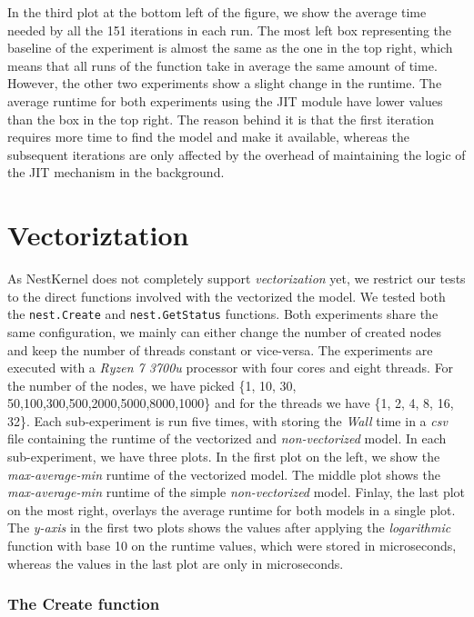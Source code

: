 In the third plot at the bottom left of the figure, we show the average time needed by all the 151 iterations in each run. The most left box representing the baseline of the experiment is almost the same as the one in the top right, which means that all runs of the function take in average the same amount of time. However, the other two experiments show a slight change in the runtime. The average runtime for both experiments using the JIT module have lower values than the box in the top right. The reason behind it is that the first iteration requires more time to find the model and make it available, whereas the subsequent iterations are only affected by the overhead of maintaining the logic of the JIT mechanism in the background.



\section{Vectoriztation}

As NestKernel does not completely support \emph	{vectorization} yet, we restrict our tests to the direct functions involved with the vectorized the model. We tested both the \texttt{nest.Create} and \texttt{nest.GetStatus} functions. Both experiments share the same configuration, we mainly can either change the number of created nodes and keep the number of threads constant or vice-versa. The experiments are executed with a \emph{Ryzen 7 3700u} processor with four cores and eight threads.
For the number of the nodes, we have picked \{1, 10, 30, 50,100,300,500,2000,5000,8000,1000\} and for the threads we have \{1, 2, 4, 8, 16, 32\}. Each sub-experiment is run five times, with storing the \emph{Wall} time in a \emph{csv} file containing the runtime of the vectorized and \emph{non-vectorized} model. In each sub-experiment, we have three plots. In the first plot on the left, we show the \emph{max-average-min} runtime of the vectorized model. The middle plot shows the \emph{max-average-min} runtime of the simple \emph{non-vectorized} model. Finlay, the last plot on the most right, overlays the average runtime for both models in a single plot. The \emph{y-axis} in the first two plots shows the values after applying the \emph{logarithmic} function with base 10 on the runtime values, which were stored in microseconds, whereas the values in the last plot are only in microseconds.

\subsubsection{The Create function}

